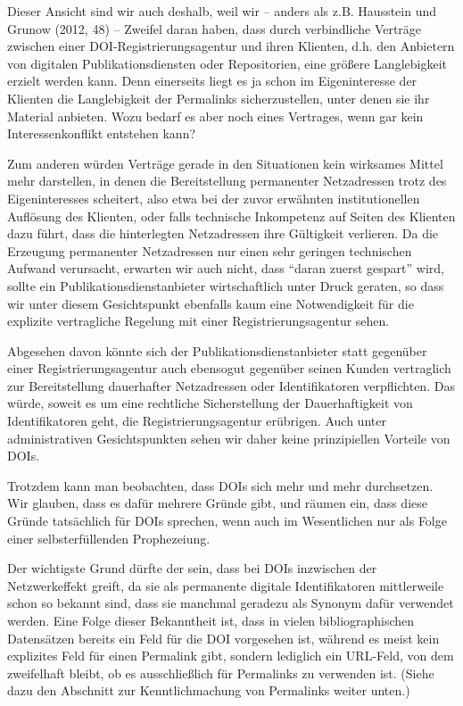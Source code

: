 \documentclass[12pt, a4paper]{article}
\begin{document}
Dieser Ansicht sind wir auch deshalb, weil wir -- anders als z.B.
Hausstein und Grunow (2012, 48) -- Zweifel daran haben, dass durch
verbindliche Verträge zwischen einer DOI-Registrierungsagentur und
ihren Klienten, d.h. den Anbietern von digitalen Publikationsdiensten
oder Repositorien, eine größere Langlebigkeit erzielt werden kann.
Denn einerseits liegt es ja schon im Eigeninteresse der
Klienten die Langlebigkeit der Permalinks sicherzustellen, unter denen
sie ihr Material anbieten. Wozu bedarf es aber noch eines Vertrages,
wenn gar kein Interessenkonflikt entstehen kann?

Zum anderen würden Verträge gerade in den Situationen kein wirksames
Mittel mehr darstellen, in denen die Bereitstellung permanenter
Netzadressen trotz des Eigeninteresses scheitert, also etwa bei der
zuvor erwähnten institutionellen Auflösung des Klienten, oder falls
technische Inkompetenz auf Seiten des Klienten dazu führt, dass die
hinterlegten Netzadressen ihre Gültigkeit verlieren. Da die Erzeugung
permanenter Netzadressen nur einen sehr geringen technischen Aufwand
verursacht, erwarten wir auch nicht, dass ``daran zuerst gespart''
wird, sollte ein Publikationsdienstanbieter wirtschaftlich unter Druck
geraten, so dass wir unter diesem Gesichtspunkt ebenfalls kaum eine
Notwendigkeit für die explizite vertragliche Regelung mit einer
Registrierungsagentur sehen.

Abgesehen davon könnte sich der Publikationsdienstanbieter statt
gegenüber einer Registrierungsagentur auch ebensogut gegenüber seinen
Kunden vertraglich zur Bereitstellung dauerhafter Netzadressen oder
Identifikatoren verpflichten. Das würde, soweit es um eine rechtliche
Sicherstellung der Dauerhaftigkeit von Identifikatoren geht, die
Registrierungsagentur erübrigen. Auch unter administrativen
Gesichtspunkten sehen wir daher keine prinzipiellen Vorteile von DOIs.

Trotzdem kann man beobachten, dass DOIs sich mehr und mehr
durchsetzen.  Wir glauben, dass es dafür mehrere Gründe gibt, und
räumen ein, dass diese Gründe tatsächlich für DOIs sprechen, wenn
auch im Wesentlichen nur als Folge einer selbsterfüllenden
Prophezeiung.

Der wichtigste Grund dürfte der sein, dass bei DOIs
inzwischen der Netzwerkeffekt greift, da sie als permanente digitale
Identifikatoren mittlerweile schon so bekannt sind, dass sie manchmal
geradezu als Synonym dafür verwendet werden. Eine Folge dieser
Bekanntheit ist, dass in vielen bibliographischen Datensätzen bereits
ein Feld für die DOI vorgesehen ist, während es meist kein explizites
Feld für einen Permalink gibt, sondern lediglich ein URL-Feld, von dem
zweifelhaft bleibt, ob es ausschließlich für Permalinks zu verwenden
ist. (Siehe dazu den Abschnitt zur Kenntlichmachung von Permalinks
weiter unten.)
\end{document}
